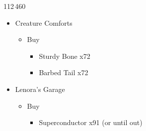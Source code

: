 \begin{paracol}{2}
\begin{shop}{112\,460}
\begin{itemize}
			\item Creature Comforts
			      \begin{itemize}
				      \item Buy
				            \begin{itemize}
					            \item Sturdy Bone x72
					            \item Barbed Tail x72
				            \end{itemize}
			      \end{itemize}
			\item Lenora's Garage
			      \begin{itemize}
				      \item Buy
				            \begin{itemize}
					            \item Superconductor x91 (or until out)
				            \end{itemize}
			      \end{itemize}
		\end{itemize}

	\end{shop}
	\switchcolumn


\end{paracol}
